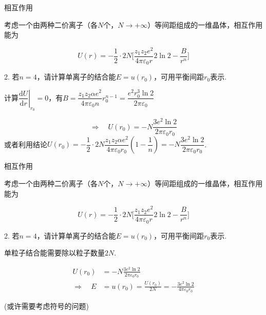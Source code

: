 \documentclass{beamer}
\begin{document}
\begin{frame}[t]{相互作用}

    {\kaishu
    \qquad 考虑一个由两种二价离子（各$N$个，$N\rightarrow +\infty$）等间距组成的一维晶体，相互作用能为\par
    
    \vspace{-0.3cm}
    
    \[
        U(r)=-\frac{1}{2}\cdot 2N\Biggl[\frac{z_{1}z_{2}e^{2}}{4\pi\varepsilon_{0}r} 2\ln 2 - \frac{B}{r^{n}}\Biggr]
    \]
    \par
    
    \vspace{-0.1cm}
    
    2. 若$n=4$，请计算单离子的结合能$E=u(r_0)$，可用平衡间距$r_0$表示.\par
    }
    \vspace{0.1cm}
    \qquad 计算$\left.\dfrac{\text{d} U}{\text{d} r}\right|_{r_{0}}=0$，有$B = \dfrac{z_{1} z_{2} \alpha e^{2}}{4 \pi \varepsilon_{0} n} r_{0}^{n-1} = \dfrac{e^{2}r_0^3 \ln 2}{2 \pi \varepsilon_{0} }$

    \[
        \Rightarrow \quad U(r_0)= - N \frac{3e^{2} \ln 2}{2 \pi \varepsilon_{0} r_0}
    \]
    或者利用结论$U(r_0)=-\dfrac{1}{2} \cdot 2N \dfrac{z_{1} z_{2} \alpha e^{2}}{4 \pi \varepsilon_{0} r_{0}}\left(1-\dfrac{1}{n}\right)= - N \dfrac{3e^{2} \ln 2}{2 \pi \varepsilon_{0} r_0}$.
    
\end{frame}

\begin{frame}[t]{相互作用}

    {\kaishu
    \qquad 考虑一个由两种二价离子（各$N$个，$N\rightarrow +\infty$）等间距组成的一维晶体，相互作用能为\par
    
    \vspace{-0.3cm}
    
    \[
        U(r)=-\frac{1}{2}\cdot 2N\Biggl[\frac{z_{1}z_{2}e^{2}}{4\pi\varepsilon_{0}r} 2\ln 2 - \frac{B}{r^{n}}\Biggr]
    \]
    \par
    
    \vspace{-0.1cm}
    
    2. 若$n=4$，请计算单离子的结合能$E=u(r_0)$，可用平衡间距$r_0$表示.\par
    }
    \vspace{0.1cm}
    \qquad 单粒子结合能需要除以粒子数量$2N$.\par
    \vspace{-0.5cm}
    \begin{align*}
        U(r_0) & = - N \frac{3e^{2} \ln 2}{2 \pi \varepsilon_{0} r_0} \\
        \Rightarrow \quad E & = u(r_0)= \frac{U(r_0)}{2N} = - \frac{3e^{2} \ln 2}{4 \pi \varepsilon_{0} r_0}    
    \end{align*}
    \par
    \vspace{-0.3cm}
    \qquad (或许需要考虑符号的问题)
\end{frame}
\end{document}
